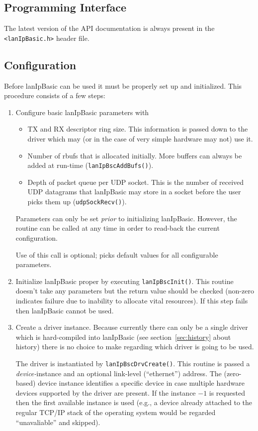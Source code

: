 \documentclass{article}
\newcommand{\lip}{lanIpBasic}
\newcommand{\rbuf}{{rbuf}}
\newcommand{\lipc}[1]{{\tt #1}}
\newcommand{\lipf}[1]{{\tt #1}}
\begin{document}
  \subsection{Programming Interface}
The latest version of the API documentation is always present in
the \lipf{<lanIpBasic.h>} header file.
  \subsection{Configuration}
Before \lip{} can be used it must be properly set up and initialized.
This procedure consists of a few steps:
\begin{enumerate}
\item Configure basic \lip{} parameters with 
  \begin{itemize}
    \item TX and RX descriptor ring size. This information is passed
          down to the driver which may (or in the case of very simple
          hardware may not) use it.
    \item Number of \rbuf{}s that is allocated initially. More buffers
          can always be added at run-time (\lipc{lanIpBscAddBufs()}).
    \item Depth of packet queue per UDP socket. This is the number
          of received UDP datagrams that \lip{} may store in a socket
          before the user picks them up (\lipc{udpSockRecv()}).
  \end{itemize}

  Parameters can only be set {\em prior} to initializing \lip{}.
  However, the routine can be called at any time in order to
  read-back the current configuration.

  Use of this call is optional; \lipc{} picks default values for
  all configurable parameters.
\item Initialize \lip{} proper by executing \lipc{lanIpBscInit()}.
  This routine doesn't take any parameters but the return value
  should be checked (non-zero indicates failure due to inability
  to allocate vital resources). If this step fails then \lip{} cannot
  be used.
\item Create a driver instance. Because currently there can only be
  a single driver which is hard-compiled into \lip{} (see
  section~\ref{sec:history} about history) there is no choice to
  make regarding which driver is going to be used.

  The driver is instantiated by \lipc{lanIpBscDrvCreate()}. This
  routine is passed a {\em device-}instance and an optional link-level
  (``ethernet'') address. The (zero-based) device instance identifies 
  a specific device in case multiple hardware devices supported by
  the driver are present. If the instance $-1$ is requested then the
  first available instance is used (e.g., a device already attached
  to the regular TCP/IP stack of the operating system would be
  regarded ``unavaliable'' and skipped).

  
\end{enumerate}
\end{document}
